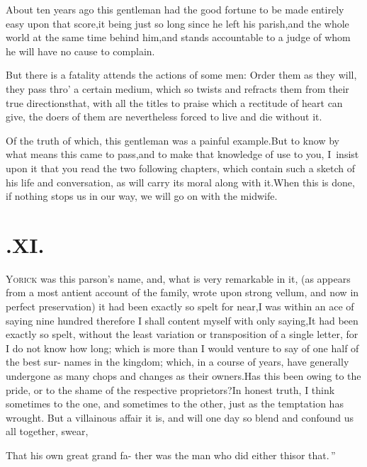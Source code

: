 \documentclass{article}
\begin{document}
About ten years ago this gentleman had the good fortune to be
made entirely easy upon that score,\tsk  it being just so long
since he left his parish,\tsk  and the whole world at the same
time behind him,\tsk  and stands accountable to a judge of whom he
will have no cause to complain.

But there is a fatality attends the actions of some men: Order
them as they will, they pass thro’ a certain medium, which so twists and refracts them from their true
directions\tsh  that, with all the titles to praise which a
rectitude of heart can give, the doers of them are nevertheless
forced to live and die without it.

Of the truth of which, this gentleman was a painful
example.\tsh  But to know by what means this came to
pass,\tsk  and to make that knowledge of use to you, I~insist upon
it that you read the two following chapters, which contain such a
sketch of his life and conversation, as will carry its moral along
with it.\tsk  When this is done, if nothing stops us in our way,
we will go on with the midwife.

\section{.\enspace XI.}

\lettrine{Y}{orick} was this parson’s name, and, what is very remarkable in it, (as
appears from a most antient account of the family, wrote upon strong vellum, and
now in perfect preservation) it had been exactly so spelt for near,\tsk  I was
within an ace of saying nine hundred\break
{}
therefore I
shall content myself with only saying,\tsh  It had been exactly so spelt, without the
least variation or transposition of a single letter, for I do not know how long;
which is more than I would venture to say of one half of the best sur-\break 
names in the
kingdom; which, in a course of years, have generally undergone as many chops and
changes as their owners.\tsk  Has this been owing to the pride, or to the shame of
the respective proprietors?\tsk  In honest truth, I think sometimes to the one, and
sometimes to the other, just as the temptation has wrought. But a villainous affair
it is, and will one day so blend and confound us all together,
swear, \begin{story}{That his own great grand fa-} 
ther was the man who did either this\break or that.\,” 
\end{story}
\end{document}
